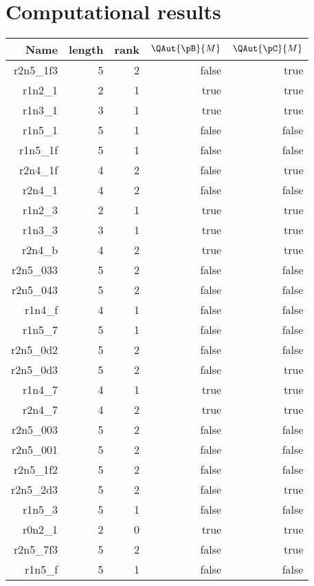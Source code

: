 
\appendix
\section{Computational results}
\begin{center}
    \small
\begin{longtable}{rrrrr}
 \hline  
  \textbf{Name} & \textbf{length} & \textbf{rank} & \textbf{$\QAut{\pB}{M}$} & \textbf{$\QAut{\pC}{M}$} \\ \hline
  r2n5\_1f3 & 5 & 2 & false & true \\ \hline
  r1n2\_1 & 2 & 1 & true & true \\ \hline
  r1n3\_1 & 3 & 1 & true & true \\ \hline
  r1n5\_1 & 5 & 1 & false & false \\ \hline
  r1n5\_1f & 5 & 1 & false & false \\ \hline
  r2n4\_1f & 4 & 2 & false & true \\ \hline
  r2n4\_1 & 4 & 2 & false & false \\ \hline
  r1n2\_3 & 2 & 1 & true & true \\ \hline
  r1n3\_3 & 3 & 1 & true & true \\ \hline
  r2n4\_b & 4 & 2 & true & true \\ \hline
  r2n5\_033 & 5 & 2 & false & false \\ \hline
  r2n5\_043 & 5 & 2 & false & false \\ \hline
  r1n4\_f & 4 & 1 & false & false \\ \hline
  r1n5\_7 & 5 & 1 & false & false \\ \hline
  r2n5\_0d2 & 5 & 2 & false & false \\ \hline
  r2n5\_0d3 & 5 & 2 & false & true \\ \hline
  r1n4\_7 & 4 & 1 & true & true \\ \hline
  r2n4\_7 & 4 & 2 & true & true \\ \hline
  r2n5\_003 & 5 & 2 & false & false \\ \hline
  r2n5\_001 & 5 & 2 & false & false \\ \hline
  r2n5\_1f2 & 5 & 2 & false & false \\ \hline
  r2n5\_2d3 & 5 & 2 & false & true \\ \hline
  r1n5\_3 & 5 & 1 & false & false \\ \hline
  r0n2\_1 & 2 & 0 & true & true \\ \hline
  r2n5\_7f3 & 5 & 2 & false & true \\ \hline
  r1n5\_f & 5 & 1 & false & false \\ \hline

\end{longtable}
\end{center}
